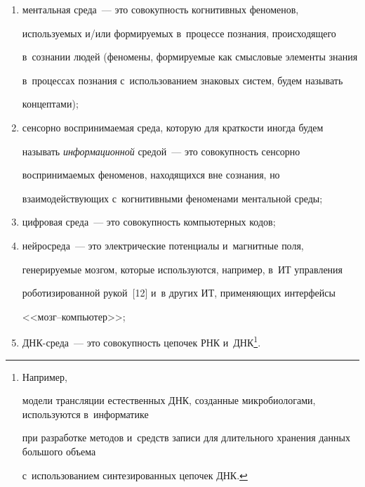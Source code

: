   \begin{enumerate}[(1)]

  \item ментальная среда~--- это совокупность когнитивных феноменов, 

используемых и\!/\!или формируемых в~процессе познания, происходящего 

в~сознании людей (феномены, формируемые как смысловые элементы знания 

в~процессах познания с~использованием знаковых систем, будем называть 

концептами);\\[-13pt]

  \item сенсорно воспринимаемая среда, которую для краткости иногда будем 

называть \textit{информационной} средой~--- это совокупность сенсорно 

воспринимаемых феноменов, находящихся вне сознания, но 

взаимодействующих с~когнитивными феноменами ментальной среды;\\[-13pt]

  \item цифровая среда~--- это совокупность компьютерных кодов;\\[-13pt]

  \item нейросреда~--- это электрические потенциалы и~магнитные поля, 

ге\-не\-ри\-ру\-емые мозгом, которые используются, например, в~ИТ управ\-ле\-ния 

ро\-бо\-ти\-зи\-ро\-ван\-ной рукой~[12] и~в других ИТ, применяющих интерфейсы  

<<мозг--компью\-тер>>;\\[-13pt]

  \item ДНК-среда~--- это совокупность цепочек РНК и~ДНК\footnote{Например, 

модели трансляции естественных ДНК, созданные микробиологами, используются в~информатике 

при разработке методов и~средств записи для длительного хранения данных большого объема 

с~использованием синтезированных цепочек ДНК.}.\\[-13pt]

  \end{enumerate}

  

